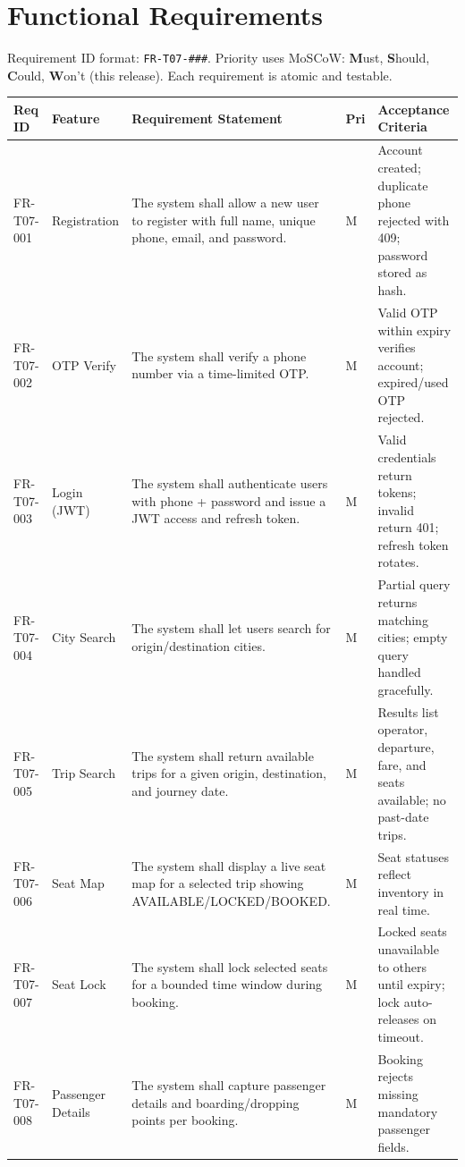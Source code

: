 \documentclass[11pt,a4paper]{article}
\newcommand{\rowstyle}{\rowcolor{headergray}}
\begin{document}
\section{Functional Requirements}

Requirement ID format: \texttt{FR-T07-\#\#\#}. Priority uses MoSCoW: \textbf{M}ust, \textbf{S}hould,
\textbf{C}ould, \textbf{W}on't (this release). Each requirement is atomic and testable.

\begin{longtable}{p{1.9cm} p{2.2cm} Y p{0.9cm} Y}
\toprule
\rowstyle \textbf{Req ID} & \textbf{Feature} & \textbf{Requirement Statement} & \textbf{Pri} & \textbf{Acceptance Criteria} \\
\midrule
\endhead
FR-T07-001 & Registration & The system shall allow a new user to register with full name, unique phone, email, and password. & M & Account created; duplicate phone rejected with 409; password stored as hash. \\
FR-T07-002 & OTP Verify & The system shall verify a phone number via a time-limited OTP. & M & Valid OTP within expiry verifies account; expired/used OTP rejected. \\
FR-T07-003 & Login (JWT) & The system shall authenticate users with phone + password and issue a JWT access and refresh token. & M & Valid credentials return tokens; invalid return 401; refresh token rotates. \\
FR-T07-004 & City Search & The system shall let users search for origin/destination cities. & M & Partial query returns matching cities; empty query handled gracefully. \\
FR-T07-005 & Trip Search & The system shall return available trips for a given origin, destination, and journey date. & M & Results list operator, departure, fare, and seats available; no past-date trips. \\
FR-T07-006 & Seat Map & The system shall display a live seat map for a selected trip showing AVAILABLE/LOCKED/BOOKED. & M & Seat statuses reflect inventory in real time. \\
FR-T07-007 & Seat Lock & The system shall lock selected seats for a bounded time window during booking. & M & Locked seats unavailable to others until expiry; lock auto-releases on timeout. \\
FR-T07-008 & Passenger Details & The system shall capture passenger details and boarding/dropping points per booking. & M & Booking rejects missing mandatory passenger fields. \\

\end{longtable}
\end{document}
